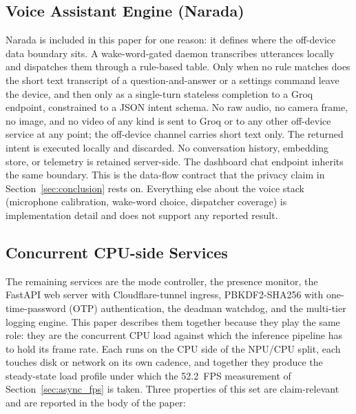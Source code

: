 \documentclass{ieeeaccess}
\begin{document}
\subsection{Voice Assistant Engine (Narada)}
\label{sec:groq_privacy}
Narada is included in this paper for one reason: it defines where the off-device data boundary sits. A wake-word-gated daemon transcribes utterances locally and dispatches them through a rule-based table. Only when no rule matches does the short text transcript of a question-and-answer or a settings command leave the device, and then only as a single-turn stateless completion to a Groq endpoint, constrained to a JSON intent schema. No raw audio, no camera frame, no image, and no video of any kind is sent to Groq or to any other off-device service at any point; the off-device channel carries short text only. The returned intent is executed locally and discarded. No conversation history, embedding store, or telemetry is retained server-side. The dashboard chat endpoint inherits the same boundary. This is the data-flow contract that the privacy claim in Section~\ref{sec:conclusion} rests on. Everything else about the voice stack (microphone calibration, wake-word choice, dispatcher coverage) is implementation detail and does not support any reported result.


\subsection{Concurrent CPU-side Services}
\label{sec:cpu_services}
The remaining services are the mode controller, the presence monitor, the FastAPI web server with Cloudflare-tunnel ingress, PBKDF2-SHA256 with one-time-password (OTP) authentication, the deadman watchdog, and the multi-tier logging engine. This paper describes them together because they play the same role: they are the concurrent CPU load against which the inference pipeline has to hold its frame rate. Each runs on the CPU side of the NPU/CPU split, each touches disk or network on its own cadence, and together they produce the steady-state load profile under which the 52.2~FPS measurement of Section~\ref{sec:async_fps} is taken. Three properties of this set are claim-relevant and are reported in the body of the paper:
\end{document}
